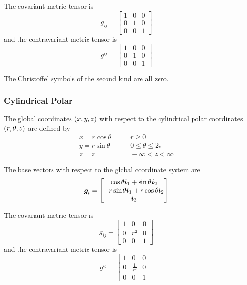 The covariant metric tensor is
\begin{equation}
  g_{ij}=\begin{bmatrix}
    1 & 0 & 0 \\
    0 & 1 & 0 \\
    0 & 0 & 1
  \end{bmatrix}
\end{equation}
and the contravariant metric tensor is
\begin{equation}
  g^{ij}=\begin{bmatrix}
    1 & 0 & 0 \\
    0 & 1 & 0 \\
    0 & 0 & 1
  \end{bmatrix}
\end{equation}

The Christoffel symbols of the second kind are all zero.

\subsubsection{Cylindrical Polar}

The global coordinates  $\left( x,y,z \right)$ with respect to the cylindrical polar
coordinates $\left( r,\theta,z \right)$ are defined by
\begin{equation}
  \begin{aligned}
    x = r\cos\theta  & \qquad r \ge0 \\
    y = r\sin\theta & \qquad 0 \le\theta\le2\pi \\
    z = z          & \qquad -\infty < z < \infty
  \end{aligned}
\end{equation}

The base vectors with respect to the global coordinate system are
\begin{equation}
  \boldsymbol{g}_{i}=\begin{bmatrix} 
    \cos\theta\boldsymbol{i}_{1} + \sin\theta\boldsymbol{i}_{2} \\ 
    -r\sin\theta\boldsymbol{i}_{1}+ r\cos\theta\boldsymbol{i}_{2} \\
    \boldsymbol{i}_{3} 
  \end{bmatrix}
\end{equation}

The covariant metric tensor is
\begin{equation}
  g_{ij}=\begin{bmatrix}
    1 & 0 & 0 \\
    0 & r^{2} & 0 \\
    0 & 0 & 1
  \end{bmatrix}
\end{equation}
and the contravariant metric tensor is
\begin{equation}
  g^{ij}=\begin{bmatrix}
    1 & 0 & 0 \\
    0 & \frac{1}{r^{2}} & 0 \\
    0 & 0 & 1
  \end{bmatrix}
\end{equation}

